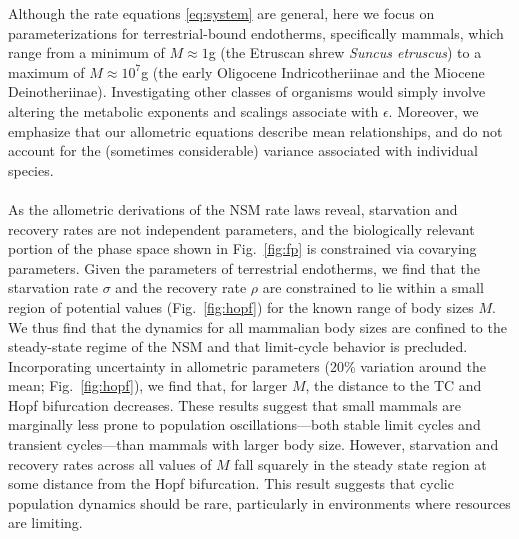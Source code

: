 \documentclass{pnastwo}
\begin{document}
\begin{article}
Although the rate equations \eqref{eq:system} are general, here we focus on parameterizations for terrestrial-bound endotherms, specifically mammals, which range from a minimum of $M\approx1$g (the Etruscan shrew \emph{Suncus etruscus}) to a maximum of $M\approx10^7$g (the early Oligocene Indricotheriinae and the Miocene Deinotheriinae).
Investigating other classes of organisms would simply involve altering the metabolic exponents and scalings associate with $\epsilon$. Moreover, we emphasize that our allometric equations describe mean relationships, and do not account for the (sometimes considerable) variance associated with individual species.\\

 \\
As the allometric derivations of the NSM rate laws reveal, starvation and recovery rates are not independent parameters, and the biologically relevant portion of the phase space shown in Fig.~\ref{fig:fp} is constrained via covarying parameters.
Given the parameters of terrestrial endotherms, we find that the starvation rate $\sigma$ and the recovery rate $\rho$ are constrained to lie within a small region of potential values (Fig.~\ref{fig:hopf}) for the known range of body sizes $M$.
We thus find that the dynamics for all mammalian body sizes are confined to the steady-state regime of the NSM and that limit-cycle behavior is precluded.
Incorporating uncertainty in allometric parameters (20\% variation around the mean; Fig.~\ref{fig:hopf}), we find that, for larger $M$, the distance to the TC and Hopf bifurcation decreases.
These results suggest that small mammals are marginally less prone to population oscillations---both stable limit cycles and transient cycles---than mammals with larger body size.  However, starvation and recovery rates across all values of $M$ fall squarely in the steady state region at some distance from the Hopf bifurcation. This result suggests that cyclic population dynamics should be rare, particularly in environments where resources are limiting.\\





\end{article}
\end{document}

